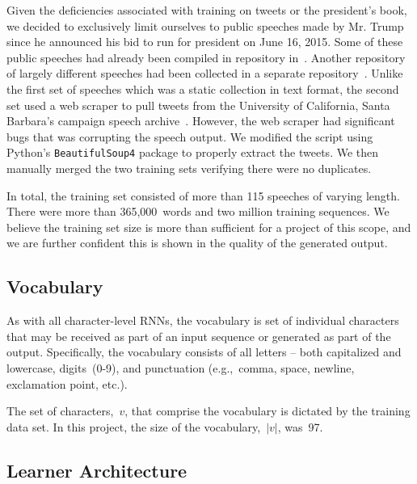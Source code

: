 \documentclass{article}
\begin{document}
Given the deficiencies associated with training on tweets or the president's book, we decided to exclusively limit ourselves to public speeches made by Mr. Trump since he announced his bid to run for president on June 16, 2015.  Some of these public speeches had already been compiled in repository in~\cite{ryanMcdermottTrumpSpeeches}.  Another repository of largely different speeches had been collected in a separate repository~\cite{pedramNavidTrumpSpeeches}.  Unlike the first set of speeches which was a static collection in text format, the second set used a web scraper to pull tweets from the University of California, Santa Barbara's campaign speech archive~\cite{americanPresidencyProject}.  However, the web scraper had significant bugs that was corrupting the speech output.  We modified the script using Python's \texttt{BeautifulSoup4} package to properly extract the tweets.  We then manually merged the two training sets verifying there were no duplicates.

In total, the training set consisted of more than 115 speeches of varying length.  There were more than 365,000~words and two million training sequences.  We believe the training set size is more than sufficient for a project of this scope, and we are further confident this is shown in the quality of the generated output.

\subsection{Vocabulary}

As with all character-level RNNs, the vocabulary is set of individual characters that may be received as part of an input sequence or generated as part of the output.  Specifically, the vocabulary consists of all letters -- both capitalized and lowercase, digits~(0-9), and punctuation (e.g.,~comma, space, newline, exclamation point, etc.).

The set of characters,~$v$, that comprise the vocabulary is dictated by the training data set.  In this project, the size of the vocabulary,~$|v|$, was~97.

\subsection{Learner Architecture}
\end{document}
